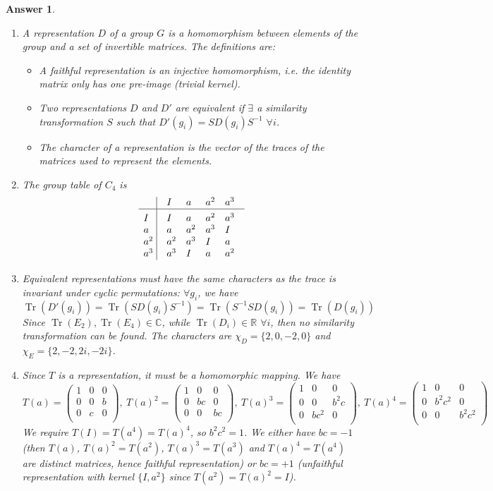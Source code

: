 \documentclass[a4paper]{article}
\DeclareMathOperator{\Tr}{Tr}
\newtheorem{ans}{Answer}[section]
\theoremstyle{new}
\begin{document}
\begin{ans}\leavevmode
\begin{enumerate}[label=(\roman*)]
\item A representation $D$ of a group $G$ is a homomorphism between elements of the group and a set of invertible matrices. The definitions are:
\begin{itemize}
\item A faithful representation is an injective homomorphism, i.e. the identity matrix only has one pre-image (trivial kernel). 
\item Two representations $D$ and $D'$ are equivalent if $\exists$ a similarity transformation $S$ such that $D'(g_i)=SD(g_i)S^{-1}$ $\forall i$.
\item The character of a representation is the vector of the traces of the matrices used to represent the elements.
\end{itemize}
\item The group table of $C_4$ is
$$\vbox{\tabskip0.5em\offinterlineskip
    \halign{\strut$#$\hfil\ \tabskip1em\vrule&&$#$\hfil\cr
       & I & a &a^2&a^3 \cr
    \noalign{\hrule}\vrule height 12pt width 0pt
    I & I & a &a^2&a^3 \cr
    a & a & a^2 & a^3 & I \cr
    a^2 & a^2 &a^3 & I &a \cr
    a^3 & a^3 & I & a& a^2\cr
}}$$
\item Equivalent representations must have the same characters as the trace is invariant under cyclic permutations: $\forall g_i$, we have
$$\Tr(D'(g_i))=\Tr(SD(g_i)S^{-1})=\Tr(S^{-1}SD(g_i))=\Tr(D(g_i))$$
Since $\Tr(E_2),\Tr(E_4)\in\mathbb{C}$, while $\Tr(D_i)\in\mathbb{R}$ $\forall i$, then no similarity transformation can be found. The characters are $\chi_D=\{2,0,-2,0\}$ and $\chi_E=\{2,-2,2i,-2i\}$.
\item Since $T$ is a representation, it must be a homomorphic mapping. We have
$$T(a)=\begin{pmatrix}1&0&0\\0&0&b\\0&c&0\\\end{pmatrix},~ T(a)^2=\begin{pmatrix}1&0&0\\0&bc&0\\0&0&bc\\\end{pmatrix},~ T(a)^3=\begin{pmatrix}1&0&0\\0&0&b^2c\\0&bc^2&0\\\end{pmatrix},~ T(a)^4=\begin{pmatrix}1&0&0\\0&b^2c^2&0\\0&0&b^2c^2\\\end{pmatrix}$$
We require $T(I)=T(a^4)=T(a)^4$, so $b^2c^2=1$. We either have $bc=-1$ (then $T(a)$, $T(a)^2=T(a^2)$, $T(a)^3=T(a^3)$ and $T(a)^4=T(a^4)$ are distinct matrices, hence faithful representation) or $bc=+1$ (unfaithful representation with kernel $\{I,a^2\}$ since $T(a^2)=T(a)^2=I$).
\end{enumerate}
\end{ans}
\newpage
\end{document}
